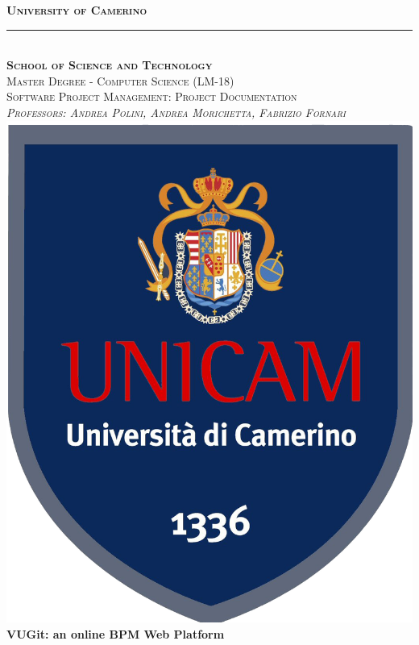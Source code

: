 \documentclass[a4paper,10pt]{report}
\begin{document}
\begin{titlepage}

\newcommand{\HRule}{\rule{\linewidth}{0.5mm}} 

\center 
 
\textsc{\huge \bfseries University of Camerino}\\\HRule\\[0.5cm]
\textsc{\LARGE \bfseries School of Science and Technology}\\[0.25cm] 
\textsc{\large Master Degree - Computer Science (LM-18)}\\[0.25cm]
\textsc{\large Software Project Management: Project Documentation}\\[0.25cm]
\textsc{\large \emph{Professors: Andrea Polini, Andrea Morichetta, Fabrizio Fornari}}\\[2cm]

\includegraphics[scale=0.9]{logo.png}\\[2cm] 

{\huge \bfseries VUGit: an online BPM Web Platform}\\[2cm]


\end{titlepage}
\end{document}
